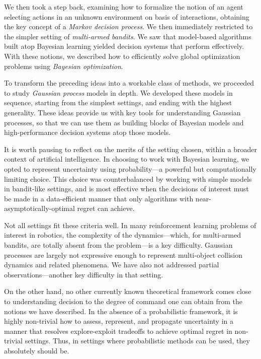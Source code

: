 \documentclass[11pt]{book}
\begin{document}
We then took a step back, examining how to formalize the notion of an agent selecting actions in an unknown environment on basis of interactions, obtaining the key concept of a \emph{Markov decision process}.
We then immediately restricted to the simpler setting of \emph{multi-armed bandits}.
We saw that model-based algorithms built atop Bayesian learning yielded decision systems that perform effectively.
With these notions, we described how to efficiently solve global optimization problems using \emph{Bayesian optimization}.

To transform the preceding ideas into a workable class of methods, we proceeded to study \emph{Gaussian process} models in depth.
We developed these models in sequence, starting from the simplest settings, and ending with the highest generality.
These ideas provide us with key tools for understanding Gaussian processes, so that we can use them as building blocks of Bayesian models and high-performance decision systems atop those models.

It is worth pausing to reflect on the merits of the setting chosen, within a broader context of artificial intelligence.
In choosing to work with Bayesian learning, we opted to represent uncertainty using probability---a powerful but computationally limiting choice.
This choice was counterbalanced by working with simple models in bandit-like settings, and is most effective when the decisions of interest must be made in a data-efficient manner that only algorithms with near-asymptotically-optimal regret can achieve.

Not all settings fit these criteria well.
In many reinforcement learning problems of interest in robotics, the complexity of the dynamics---which, for multi-armed bandits, are totally absent from the problem---is a key difficulty.
Gaussian processes are largely not expressive enough to represent multi-object collision dynamics and related phenomena.
We have also not addressed partial observations---another key difficulty in that setting.

On the other hand, no other currently known theoretical framework comes close to understanding decision to the degree of command one can obtain from the notions we have described.
In the absence of a probabilistic framework, it is highly non-trivial how to assess, represent, and propagate uncertainty in a manner that resolves explore-exploit tradeoffs to achieve optimal regret in non-trivial settings.
Thus, in settings where probabilistic methods can be used, they absolutely should be.
\end{document}
